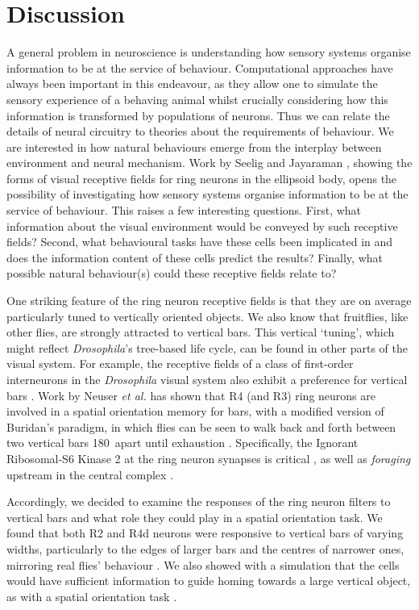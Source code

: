 \section*{Discussion}
A general problem in neuroscience is understanding how sensory systems organise information to be at the service of behaviour. Computational approaches have always been important in this endeavour, as they allow one to simulate the sensory experience of a behaving animal whilst crucially considering how this information is transformed by populations of neurons. Thus we can relate the details of neural circuitry to theories about the requirements of behaviour.
We are interested in how natural behaviours emerge from the interplay between environment and neural mechanism.
Work by Seelig and Jayaraman \cite{Seelig2013}, showing the forms of visual receptive fields for ring neurons in the ellipsoid body, opens the possibility of investigating how sensory systems organise information to be at the service of behaviour.
This raises a few interesting questions.
First, what information about the visual environment would be conveyed by such receptive fields?
Second, what behavioural tasks have these cells been implicated in and does the information content of these cells predict the results?
Finally, what possible natural behaviour(s) could these receptive fields relate to?

One striking feature of the ring neuron receptive fields is that they are on average particularly tuned to vertically oriented objects.
We also know that fruitflies, like other flies, are strongly attracted to vertical bars.
This vertical `tuning', which might reflect \emph{Drosophila}'s tree-based life cycle, can be found in other parts of the visual system.
For example, the receptive fields of a class of first-order interneurons in the \emph{Drosophila} visual system also exhibit a preference for vertical bars \cite{Freifeld2013}.
Work by Neuser \emph{et al.} \cite{Neuser2008} has shown that R4 (and R3) ring neurons are involved in a spatial orientation memory for bars, with a modified version of Buridan's paradigm, in which flies can be seen to walk back and forth between two vertical bars 180\degree\ apart until exhaustion \cite{Bulthoff1982}.
Specifically, the Ignorant Ribosomal-S6 Kinase 2 at the ring neuron synapses is critical \cite{Neuser2008}, as well as \emph{foraging} upstream in the central complex \cite{Kuntz2012}.

Accordingly, we decided to examine the responses of the ring neuron filters to vertical bars and what role they could play in a spatial orientation task.
We found that both R2 and R4d neurons were responsive to vertical bars of varying widths, particularly to the edges of larger bars and the centres of narrower ones, mirroring real flies' behaviour \cite{Osorio1990}.
We also showed with a simulation that the cells would have sufficient information to guide homing towards a large vertical object, as with a spatial orientation task \cite{Neuser2008}.

